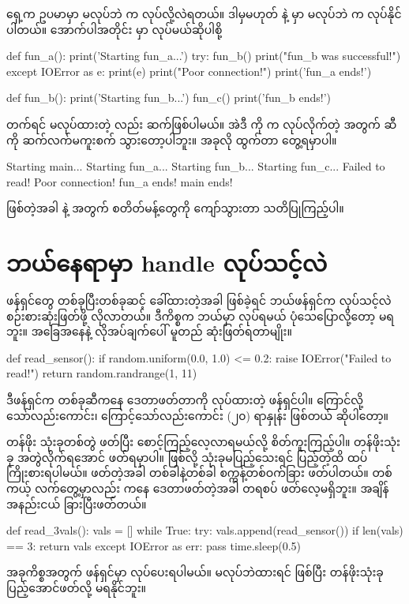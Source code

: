 ရှေ့က ဥပမာမှာ    မလုပ်ဘဲ  က  လုပ်လို့လဲရတယ်။ ဒါမှမဟုတ်  နဲ့  မှာ  မလုပ်ဘဲ  က လုပ်နိုင်ပါတယ်။ အောက်ပါအတိုင်း  မှာ  လုပ်မယ်ဆိုပါစို့ 

%
\begin{py}
def fun_a():
    print('Starting fun_a...')
    try:
        fun_b()
        print("fun_b was successful!")
    except IOError as e:
        print(e)
        print("Poor connection!")
    print('fun_a ends!')


def fun_b():
    print('Starting fun_b...')
    fun_c()
    print('fun_b ends!')
\end{py}
%
  တက်ရင်  မလုပ်ထားတဲ့  လည်း   ဆက်ဖြစ်ပါမယ်။ အဲဒီ  ကို  က  လုပ်လိုက်တဲ့ အတွက်  ဆီကို ဆက်လက်မကူးစက် သွားတော့ပါဘူး။  အခုလို ထွက်တာ တွေ့ရမှာပါ။
%
\begin{codetxt}
Starting main...
Starting fun_a...
Starting fun_b...
Starting fun_c...
Failed to read!
Poor connection!
fun_a ends!
main ends!
\end{codetxt}
%
  ဖြစ်တဲ့အခါ  နဲ့  အတွက်  စတိတ်မန့်တွေကို ကျော်သွားတာ သတိပြုကြည့်ပါ။



\section{ဘယ်နေရာမှာ handle လုပ်သင့်လဲ}
ဖန်ရှင်တွေ တစ်ခုပြီးတစ်ခုဆင့် ခေါ်ထားတဲ့အခါ  ဖြစ်ခဲ့ရင် ဘယ်ဖန်ရှင်က  လုပ်သင့်လဲ စဉ်းစားဆုံးဖြတ်ဖို့ လိုလာတယ်။ ဒီကိစ္စက ဘယ်မှာ  လုပ်ရမယ် ပုံသေပြောလို့တော့ မရဘူး။ အခြေအနေနဲ့ လိုအပ်ချက်ပေါ် မူတည် ဆုံးဖြတ်ရတာမျိုး။ 
%
%
\begin{py}
def read_sensor():
    if random.uniform(0.0, 1.0) <= 0.2:
        raise IOError("Failed to read!")
    return random.randrange(1, 11)
\end{py}
%
ဒီဖန်ရှင်က  တစ်ခုဆီကနေ ဒေတာဖတ်တာကို  လုပ်ထားတဲ့ ဖန်ရှင်ပါ။  ကြောင်လို့သော်လည်းကောင်း၊  ကြောင့်သော်လည်းကောင်း (၂၀) ရာနှုန်း  ဖြစ်တယ် ဆိုပါတော့။ 

 တန်ဖိုး သုံးခုတစ်တွဲ ဖတ်ပြီး စောင့်ကြည့်လေ့လာရမယ်လို့ စိတ်ကူးကြည့်ပါ။ တန်ဖိုးသုံးခု အတွဲလိုက်ရအောင် ဖတ်ရမှာပါ။  ဖြစ်လို့ သုံးခုမပြည့်သေးရင် ပြည့်တဲ့ထိ ထပ်ကြိုးစားရပါမယ်။  ဖတ်တဲ့အခါ တစ်ခါနဲ့တစ်ခါ စက္ကန့်တစ်ဝက်ခြား ဖတ်ပါတယ်။ တစ်ကယ့် လက်တွေ့မှာလည်း  ကနေ ဒေတာဖတ်တဲ့အခါ တရစပ် ဖတ်လေ့မရှိဘူး။ အချိန်အနည်းငယ် ခြားပြီးဖတ်တယ်။
%
\begin{py}
def read_3vals():
    vals = []
    while True:
        try:
            vals.append(read_sensor())
            if len(vals) == 3:
                return vals
        except IOError as err:
            pass
        time.sleep(0.5)
\end{py}
%
အခုကိစ္စအတွက်  ဖန်ရှင်မှာ  လုပ်ပေးရပါမယ်။ မလုပ်ဘဲထားရင်  ဖြစ်ပြီး တန်ဖိုးသုံးခု ပြည့်အောင်ဖတ်လို့ မရနိုင်ဘူး။

